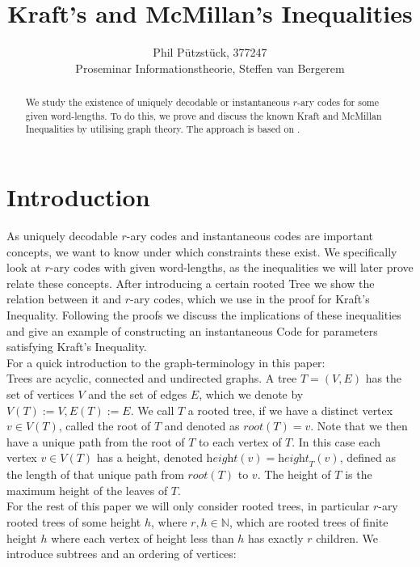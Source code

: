 \documentclass[12pt]{article}
\newcommand{\he}[0]{\textit{height}}
\newcommand{\ro}[0]{\textit{root}}
\begin{document}
\title{Kraft's and McMillan's Inequalities}
\author{Phil Pützstück, 377247\\
Proseminar Informationstheorie, Steffen van Bergerem}
\maketitle

\begin{abstract}
    We study the existence of uniquely decodable or instantaneous $r$-ary codes for some given word-lengths.
    To do this, we prove and discuss the known Kraft and McMillan Inequalities by utilising graph theory.
    The approach is based on \cite{ICT}.
\end{abstract}

\section*{Introduction}
As uniquely decodable $r$-ary codes and instantaneous codes are important concepts,
we want to know under which constraints these exist.
We specifically look at $r$-ary codes with given word-lengths, as the inequalities
we will later prove relate these concepts.
After introducing a certain rooted Tree we show the relation between it and $r$-ary codes,
which we use in the proof for Kraft's Inequality.
Following the proofs we discuss the implications of these inequalities and give an example of constructing
an instantaneous Code for parameters satisfying Kraft's Inequality.\\
For a quick introduction to the graph-terminology in this paper:\\[10pt]
Trees are acyclic, connected and undirected graphs.
A tree $T = (V,E)$ has the set of vertices $V$ and the set of edges $E$, which we denote by $V(T) := V, E(T) := E$.
We call $T$ a rooted tree, if we have a distinct vertex $v \in V(T)$,
called the root of $T$ and denoted as $\ro(T) = v$.
Note that we then have a unique path from the root of $T$ to each vertex of $T$.
In this case each vertex $v \in V(T)$ has a height, denoted $\he(v) = \he_T(v)$,
defined as the length of that unique path from $\ro(T)$ to $v$. The height of $T$ is
the maximum height of the leaves of $T$.\\[10pt]
For the rest of this paper we will only consider rooted trees, in particular $r$-ary rooted trees of some height $h$, where $r,h \in \mathbb{N}$, which
are rooted trees of finite height $h$ where each vertex of height less than $h$ has exactly $r$ children.
We introduce subtrees and an ordering of vertices:
\end{document}
